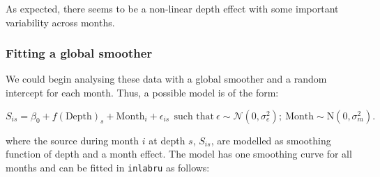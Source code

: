 \documentclass[
  letterpaper,
  DIV=11,
  numbers=noendperiod]{scrartcl}
\newenvironment{Shaded}{\begin{snugshade}}{\end{snugshade}}
\newcommand{\AttributeTok}[1]{\textcolor[rgb]{0.40,0.45,0.13}{#1}}
\newcommand{\FunctionTok}[1]{\textcolor[rgb]{0.28,0.35,0.67}{#1}}
\newcommand{\NormalTok}[1]{\textcolor[rgb]{0.00,0.23,0.31}{#1}}
\newcommand{\OtherTok}[1]{\textcolor[rgb]{0.00,0.23,0.31}{#1}}
\newcommand{\SpecialCharTok}[1]{\textcolor[rgb]{0.37,0.37,0.37}{#1}}
\newcommand{\StringTok}[1]{\textcolor[rgb]{0.13,0.47,0.30}{#1}}
\begin{document}
\begin{Shaded}
\end{Shaded}

As expected, there seems to be a non-linear depth effect with some
important variability across months.

\subsubsection{Fitting a global
smoother}\label{fitting-a-global-smoother}

We could begin analysing these data with a global smoother and a random
intercept for each month. Thus, a possible model is of the form:

\[
S_{is} = \beta_0 + f(\text{Depth})_s + \text{Month}_i +  \epsilon_{is} ~~\text{such that}~ \epsilon \sim \mathcal{N}(0,\sigma^2_e);~ \text{Month} \sim \mathrm{N}(0,\sigma^2_m).
\]

where the source during month \(i\) at depth \(s\), \(S_{is}\), are
modelled as smoothing function of depth and a month effect. The model
has one smoothing curve for all months and can be fitted in
\texttt{inlabru} as follows:
\end{document}
